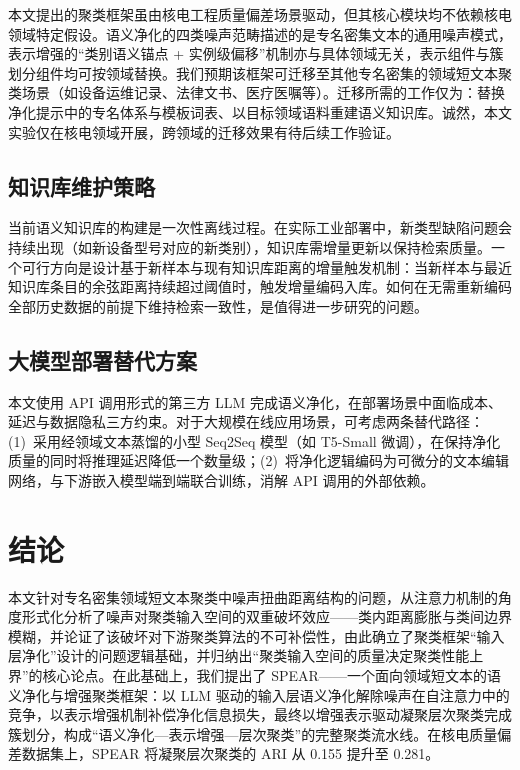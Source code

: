 \documentclass[10.5pt,compsoc,UTF8]{CjC}
\theoremstyle{mystyle}
\begin{document}
本文提出的聚类框架虽由核电工程质量偏差场景驱动，但其核心模块均不依赖核电领域特定假设。语义净化的四类噪声范畴描述的是专名密集文本的通用噪声模式，表示增强的``类别语义锚点 + 实例级偏移''机制亦与具体领域无关，表示组件与簇划分组件均可按领域替换。我们预期该框架可迁移至其他专名密集的领域短文本聚类场景（如设备运维记录、法律文书、医疗医嘱等）。迁移所需的工作仅为：替换净化提示中的专名体系与模板词表、以目标领域语料重建语义知识库。诚然，本文实验仅在核电领域开展，跨领域的迁移效果有待后续工作验证。

{\heiti \subsection{知识库维护策略}}

当前语义知识库的构建是一次性离线过程。在实际工业部署中，新类型缺陷问题会持续出现（如新设备型号对应的新类别），知识库需增量更新以保持检索质量。一个可行方向是设计基于新样本与现有知识库距离的增量触发机制：当新样本与最近知识库条目的余弦距离持续超过阈值时，触发增量编码入库。如何在无需重新编码全部历史数据的前提下维持检索一致性，是值得进一步研究的问题。

{\heiti \subsection{大模型部署替代方案}}

本文使用 API 调用形式的第三方 LLM 完成语义净化，在部署场景中面临成本、延迟与数据隐私三方约束。对于大规模在线应用场景，可考虑两条替代路径：(1)~采用经领域文本蒸馏的小型 Seq2Seq 模型（如 T5-Small 微调），在保持净化质量的同时将推理延迟降低一个数量级；(2)~将净化逻辑编码为可微分的文本编辑网络，与下游嵌入模型端到端联合训练，消解 API 调用的外部依赖。

\section{\heiti 结论}
\label{sec:conclusion}

本文针对专名密集领域短文本聚类中噪声扭曲距离结构的问题，从注意力机制的角度形式化分析了噪声对聚类输入空间的双重破坏效应——类内距离膨胀与类间边界模糊，并论证了该破坏对下游聚类算法的不可补偿性，由此确立了聚类框架``输入层净化''设计的问题逻辑基础，并归纳出``聚类输入空间的质量决定聚类性能上界''的核心论点。在此基础上，我们提出了 SPEAR——一个面向领域短文本的语义净化与增强聚类框架：以 LLM 驱动的输入层语义净化解除噪声在自注意力中的竞争，以表示增强机制补偿净化信息损失，最终以增强表示驱动凝聚层次聚类完成簇划分，构成``语义净化—表示增强—层次聚类''的完整聚类流水线。在核电质量偏差数据集上，SPEAR 将凝聚层次聚类的 ARI 从 0.155 提升至 0.281。
\end{document}

